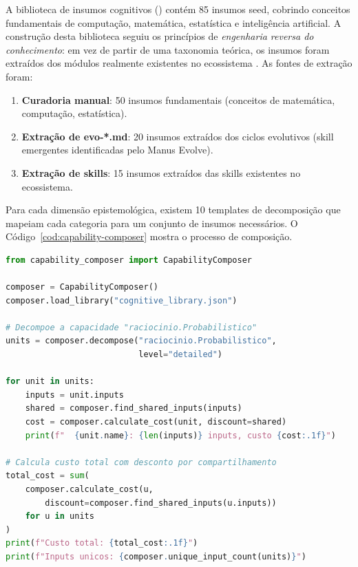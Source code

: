 A biblioteca de insumos cognitivos () contém
85 insumos seed, cobrindo conceitos fundamentais de computação, matemática,
estatística e inteligência artificial. A construção desta biblioteca seguiu
os princípios de \emph{engenharia reversa do conhecimento}: em vez de
partir de uma taxonomia teórica, os insumos foram extraídos dos módulos
realmente existentes no ecossistema \cite{opencode2026spec033,
opencode2026spec035, opencode2026ecosystem}. As fontes de extração foram:

\begin{enumerate}
\item \textbf{Curadoria manual}: 50 insumos fundamentais (conceitos de
matemática, computação, estatística).
\item \textbf{Extração de evo-*.md}: 20 insumos extraídos dos ciclos
evolutivos (skill emergentes identificadas pelo Manus Evolve).
\item \textbf{Extração de skills}: 15 insumos extraídos das skills
existentes no ecossistema.
\end{enumerate}

Para cada dimensão epistemológica, existem 10 templates de decomposição
que mapeiam cada categoria para um conjunto de insumos necessários. O
Código~\ref{cod:capability-composer} mostra o processo de composição.

\begin{lstlisting}[caption={Composicao de uma capacidade a partir de
insumos cognitivos.},
label={cod:capability-composer}, style=pythonstyle, language=Python]
from capability_composer import CapabilityComposer

composer = CapabilityComposer()
composer.load_library("cognitive_library.json")

# Decompoe a capacidade "raciocinio.Probabilistico"
units = composer.decompose("raciocinio.Probabilistico",
                           level="detailed")

for unit in units:
    inputs = unit.inputs
    shared = composer.find_shared_inputs(inputs)
    cost = composer.calculate_cost(unit, discount=shared)
    print(f"  {unit.name}: {len(inputs)} inputs, custo {cost:.1f}")

# Calcula custo total com desconto por compartilhamento
total_cost = sum(
    composer.calculate_cost(u,
        discount=composer.find_shared_inputs(u.inputs))
    for u in units
)
print(f"Custo total: {total_cost:.1f}")
print(f"Inputs unicos: {composer.unique_input_count(units)}")
\end{lstlisting}

